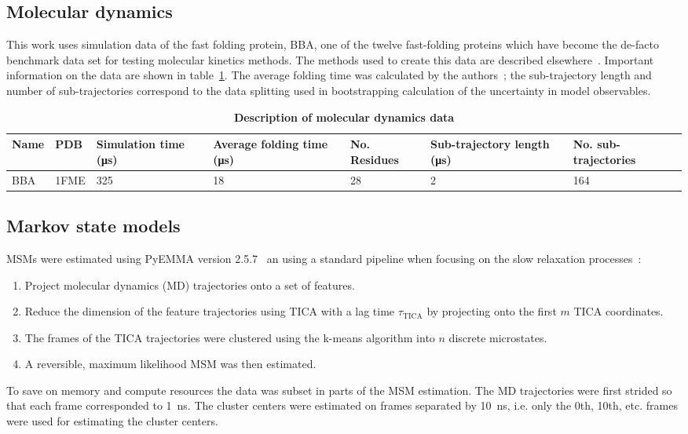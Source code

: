 \documentclass[journal=jacsat,manuscript=article]{achemso}
\begin{document}
\subsection{Molecular dynamics}

This work uses simulation data of the fast folding protein, BBA, one of the twelve fast-folding proteins which have become the de-facto benchmark data set for testing molecular kinetics methods. The methods used to create this data are described elsewhere~\cite{lindorff-larsen_how_2011}. Important information on the data are shown in table~\ref{tab:data_description}. The average folding time was calculated by the authors~\cite{lindorff-larsen_how_2011}; the sub-trajectory length and number of sub-trajectories correspond to the data splitting used in bootstrapping calculation of the uncertainty in model observables.

\begin{table}
    \caption{\textbf{Description of molecular dynamics data}}
    \begin{tabularx}{\textwidth}{llXXXXX}
    \toprule
    Name & PDB & Simulation time (\si{\micro\second}) & Average folding time (\si{\micro\second}) & No. Residues & Sub-trajectory length (\si{\micro\second}) & No. sub-trajectories \\
    \midrule
    BBA                 & 1FME      & \num{325}     & \num{18}  & 28 & \num{2} & 164 \\
    \bottomrule
    \end{tabularx}
    \label{tab:data_description}
\end{table}

\subsection{Markov state models}
MSMs were estimated using PyEMMA version 2.5.7~\cite{schererPyEMMASoftwarePackage2015a} an using a standard pipeline when focusing on the slow relaxation processes~\cite{noe_markov_2019, husic_markov_2018}: 
\begin{enumerate}
    \item Project molecular dynamics (MD) trajectories onto a set of features. 
    \item Reduce the dimension of the feature trajectories using TICA with a lag time $\tau_{\mathrm{TICA}}$ by projecting onto the first $m$ TICA coordinates. 
    \item The frames of the TICA trajectories were clustered using the k-means algorithm into $n$ discrete microstates. 
    \item A reversible, maximum likelihood MSM was then estimated. 
\end{enumerate}
To save on memory and compute resources  the data was subset in parts of the MSM estimation. The MD trajectories were first strided so that each frame corresponded to \SI{1}{\nano\second}. The cluster centers were estimated on frames separated by \SI{10}{\nano\second}, i.e. only the 0th, 10th, etc. frames were used for estimating the cluster centers. 
\end{document}
